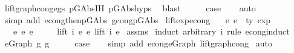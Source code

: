 \begin{isabellebody}
\ lift{\isacharunderscore}{\kern0pt}graph{\isacharunderscore}{\kern0pt}cong{\isacharunderscore}{\kern0pt}egs\ p{\isacharunderscore}{\kern0pt}GAbs{\isachardot}{\kern0pt}IH\ p{\isacharunderscore}{\kern0pt}GAbs{\isachardot}{\kern0pt}hyps\ \isamarkupfalse%
\ blast\isanewline
\ \ \isamarkupfalse%
\ \isamarkupfalse%
\ {\isacharquery}{\kern0pt}case\isanewline
\ \ \isamarkupfalse%
\ auto\isanewline
\ \ \ \ \isamarkupfalse%
\ {\isacharparenleft}{\kern0pt}simp\ add{\isacharcolon}{\kern0pt}\ econg{\isacharunderscore}{\kern0pt}then{\isacharunderscore}{\kern0pt}p{\isacharunderscore}{\kern0pt}GAbs\ gcong{\isachardot}{\kern0pt}p{\isacharunderscore}{\kern0pt}GAbs{\isacharparenright}{\kern0pt}\isanewline
{}\isamarkupfalse%
%
\endisatagproof
{\isafoldproof}%
%
\isadelimproof
\isanewline
%
\endisadelimproof
\isanewline
\isanewline
{}\isamarkupfalse%
\ lift{\isacharunderscore}{\kern0pt}exp{\isacharunderscore}{\kern0pt}econg{\isacharcolon}{\kern0pt}\isanewline
\ \ \ e{}\ e{}\ {\isacharcolon}{\kern0pt}{\isacharcolon}{\kern0pt}\ {\isachardoublequoteopen}{\isacharprime}{\kern0pt}ty\ exp{\isachardoublequoteclose}\isanewline
\ \ \ {\isachardoublequoteopen}e{}\ {\isasymsimeq}e\ e{}{\isachardoublequoteclose}\isanewline
\ \ \ \ \ {\isachardoublequoteopen}lift\ i\ e{}\ {\isasymsimeq}e\ lift\ i\ e{}{\isachardoublequoteclose}\isanewline
%
\isadelimproof
%
\endisadelimproof
%
\isatagproof
{}\isamarkupfalse%
\ assms\isanewline
{}\isamarkupfalse%
\ {\isacharparenleft}{\kern0pt}induct\ arbitrary{\isacharcolon}{\kern0pt}\ i\ rule{\isacharcolon}{\kern0pt}\ econg{\isachardot}{\kern0pt}induct{\isacharparenright}{\kern0pt}\isanewline
\ \ \isamarkupfalse%
\ {\isacharparenleft}{\kern0pt}e{\isacharunderscore}{\kern0pt}Graph\ g\ g{\isacharprime}{\kern0pt}{\isacharparenright}{\kern0pt}\isanewline
\ \ \isamarkupfalse%
\ \isamarkupfalse%
\ {\isacharquery}{\kern0pt}case\isanewline
\ \ \isamarkupfalse%
\ {\isacharparenleft}{\kern0pt}simp\ add{\isacharcolon}{\kern0pt}\ econg{\isachardot}{\kern0pt}e{\isacharunderscore}{\kern0pt}Graph\ lift{\isacharunderscore}{\kern0pt}graph{\isacharunderscore}{\kern0pt}cong{\isacharparenright}{\kern0pt}\isanewline
{}\isamarkupfalse%
\ auto%
\endisatagproof
{\isafoldproof}%

\end{isabellebody}
